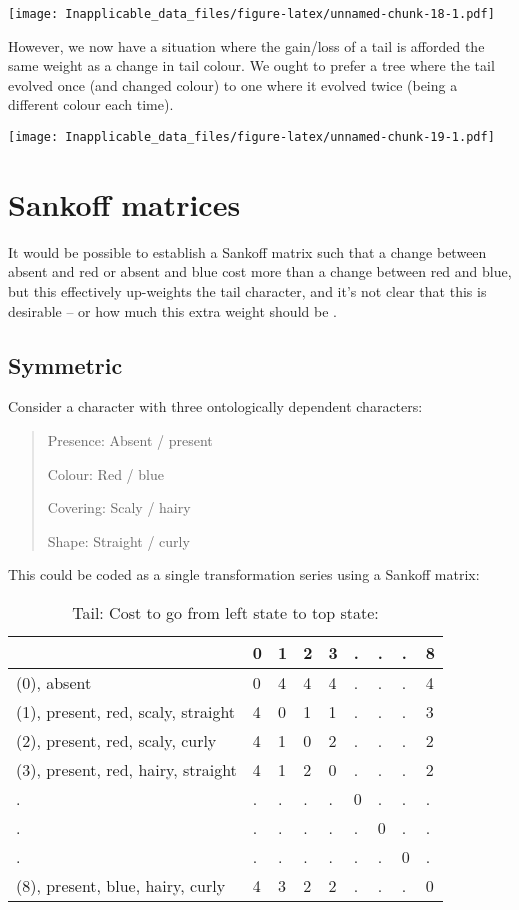 \documentclass[]{book}
\theoremstyle{definition}
\theoremstyle{definition}
\theoremstyle{definition}
\theoremstyle{remark}
\begin{document}
\texttt{[image: Inapplicable\_data\_files/figure-latex/unnamed-chunk-18-1.pdf]}

However, we now have a situation where the gain/loss of a tail is
afforded the same weight as a change in tail colour. We ought to prefer
a tree where the tail evolved once (and changed colour) to one where it
evolved twice (being a different colour each time).

\texttt{[image: Inapplicable\_data\_files/figure-latex/unnamed-chunk-19-1.pdf]}

\hypertarget{sankoff-matrices}{%
\section{Sankoff matrices}\label{sankoff-matrices}}

It would be possible to establish a Sankoff matrix
\citep{Sankoff1975, Sankoff1983} such that a change between absent and
red or absent and blue cost more than a change between red and blue, but
this effectively up-weights the tail character, and it's not clear that
this is desirable -- or how much this extra weight should be
\citep{Maddison1993}.

\hypertarget{symmetric}{%
\subsection{Symmetric}\label{symmetric}}

Consider a character with three ontologically dependent characters:

\begin{quote}
Presence: Absent / present

Colour: Red / blue

Covering: Scaly / hairy

Shape: Straight / curly
\end{quote}

This could be coded as a single transformation series using a Sankoff
matrix:

\begin{table}

\caption{\label{tab:unnamed-chunk-20}Tail: Cost to go from left state to top state:}
\centering
\begin{tabular}[t]{l|l|l|l|l|l|l|l|l}
\hline
  & 0 & 1 & 2 & 3 & . & . & . & 8\\
\hline
(0), absent & 0 & 4 & 4 & 4 & . & . & . & 4\\
\hline
(1), present, red, scaly, straight & 4 & 0 & 1 & 1 & . & . & . & 3\\
\hline
(2), present, red, scaly, curly & 4 & 1 & 0 & 2 & . & . & . & 2\\
\hline
(3), present, red, hairy, straight & 4 & 1 & 2 & 0 & . & . & . & 2\\
\hline
. & . & . & . & . & 0 & . & . & .\\
\hline
. & . & . & . & . & . & 0 & . & .\\
\hline
. & . & . & . & . & . & . & 0 & .\\
\hline
(8), present, blue, hairy, curly & 4 & 3 & 2 & 2 & . & . & . & 0\\
\hline
\end{tabular}
\end{table}
\end{document}
